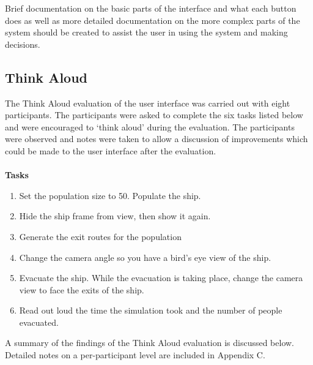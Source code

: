Brief documentation on the basic parts of the interface and what each button does as well as more detailed documentation on the more complex parts of the system should be created to assist the user in using the system and making decisions.

\subsection{Think Aloud}
The Think Aloud evaluation of the user interface was carried out with eight participants. The participants were asked to complete the six tasks listed below and were encouraged to ‘think aloud’ during the evaluation. The participants were observed and notes were taken to allow a discussion of improvements which could be made to the user interface after the evaluation.
\\
\\
\textbf{Tasks}
\begin{enumerate}
\item Set the population size to 50. Populate the ship.
\item Hide the ship frame from view, then show it again.
\item Generate the exit routes for the population
\item Change the camera angle so you have a bird’s eye view of the ship.
\item Evacuate the ship. While the evacuation is taking place, change the camera view to face the exits of the ship.
\item Read out loud the time the simulation took and the number of people evacuated.
\end{enumerate}
A summary of the findings of the Think Aloud evaluation is discussed below. Detailed notes on a per-participant level are included in Appendix C.

